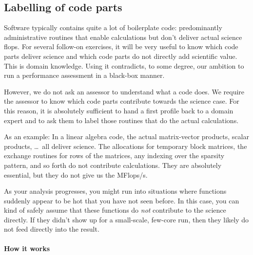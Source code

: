 
\subsection{Labelling of code parts}

Software typically contains quite a lot of boilerplate code: 
predominantly administrative routines that enable calculations but don't deliver actual science flops. 
For several follow-on exercises, it will be very useful to know which code parts deliver science and which code parts do not directly add scientific value.
This is domain knowledge.
Using it contradicts, to some degree, our ambition to run a performance assessment in a black-box manner.


However, we do not ask an assessor to understand what a code does.
We require the assessor to know which code parts contribute towards the science case.
For this reason, it is absolutely sufficient to hand a first profile back to a domain expert and to ask them to label those routines that do the actual calculations. 

As an example: 
In a linear algebra code, the actual matrix-vector products, scalar products, \ldots~all deliver science.
The allocations for temporary block matrices, the exchange routines for rows of the matrices, any indexing over the sparsity pattern, and so forth do not contribute calculations.
They are absolutely essential, but they do not give us the MFlops/s.


As your analysis progresses, you might run into situations where functions suddenly appear to be hot that you have not seen before.
In this case, you can kind of safely assume that these functions do \emph{not} contribute to the science directly.
If they didn't show up for a small-scale, few-core run, then they likely do not feed directly into the result.


\paragraph*{How it works}

